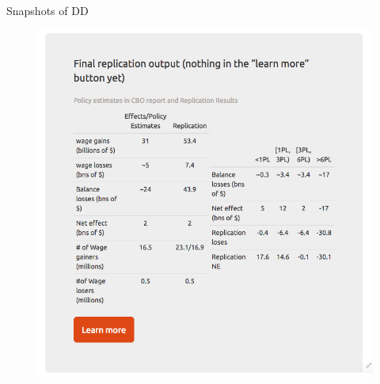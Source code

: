 \documentclass{beamer}
\newcommand{\backupend}{
   \setcounter{framenumber}{\value{finalframe}}
}
\begin{document}
\begin{frame}[plain]{Snapshots of DD}
\vspace{-2em}
\begin{figure}[h!]
\centering
\hspace{-5em} \includegraphics[scale = 0.28]{../Images/Screen_Shot6}
\hyperlink{demo}{\beamerbutton{}}
\end{figure}	
\end{frame}


\backupend


 
\end{document}
